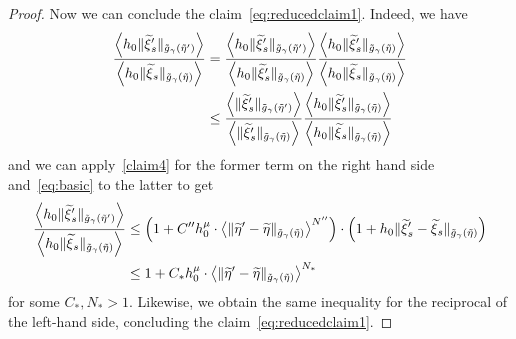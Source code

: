 \documentclass[AHL,Unicode,longabstracts,published]{cedram}
\let\oldtilde\tilde
\renewcommand*{\tilde}[1]{\mathchoice{\widetilde{#1}}{\widetilde{#1}}{\oldtilde{#1}}{\oldtilde{#1}}}
\begin{document}
\begin{proof}
Now we can conclude the claim~\eqref{eq:reducedclaim1}. Indeed, we have
\begin{align*}
\frac{\left\langle h_{0}\|\tilde{\xi}'_{s}\|_{\tilde{g}_{\gamma}\left(\tilde{\eta}'\right)}\right\rangle}{\left\langle h_{0}\|\tilde{\xi}_{s}\|_{\tilde{g}_{\gamma}\left(\tilde{\eta}\right)}\right\rangle} & =\frac{\left\langle h_{0}\|\tilde{\xi}'_{s}\|_{\tilde{g}_{\gamma}\left(\tilde{\eta}'\right)}\right\rangle}{\left\langle h_{0}\|\tilde{\xi}'_{s}\|_{\tilde{g}_{\gamma}\left(\tilde{\eta}\right)}\right\rangle}\frac{\left\langle h_{0}\|\tilde{\xi}'_{s}\|_{\tilde{g}_{\gamma}\left(\tilde{\eta}\right)}\right\rangle}{\left\langle h_{0}\|\tilde{\xi}_{s}\|_{\tilde{g}_{\gamma}\left(\tilde{\eta}\right)}\right\rangle}\\
& \le\frac{\left\langle\|\tilde{\xi}'_{s}\|_{\tilde{g}_{\gamma}\left(\tilde{\eta}'\right)}\right\rangle}{\left\langle\|\tilde{\xi}'_{s}\|_{\tilde{g}_{\gamma}\left(\tilde{\eta}\right)}\right\rangle}\frac{\left\langle h_{0}\|\tilde{\xi}'_{s}\|_{\tilde{g}_{\gamma}\left(\tilde{\eta}\right)}\right\rangle}{\left\langle h_{0}\|\tilde{\xi}_{s}\|_{\tilde{g}_{\gamma}\left(\tilde{\eta}\right)}\right\rangle}
\end{align*}
and we can apply~\eqref{claim4} for the former term on the right hand side and~\eqref{eq:basic} to the latter to get
\begin{align*}
\frac{\left\langle h_{0}\|\tilde{\xi}'_{s}\|_{\tilde{g}_{\gamma}\left(\tilde{\eta}'\right)}\right\rangle}{\left\langle h_{0}\|\tilde{\xi}_{s}\|_{\tilde{g}_{\gamma}\left(\tilde{\eta}\right)}\right\rangle} & \le \left(1+C''h_{0}^{\mu}\cdot\left\langle \|\tilde{\eta}'-\tilde{\eta}\|_{\tilde{g}_{\gamma}\left(\tilde{\eta}\right)}\right\rangle ^{N''}\right)\cdot\left(1+h_{0}\|\tilde{\xi}'_{s}-\tilde{\xi}_{s}\|_{\tilde{g}_{\gamma}\left(\tilde{\eta}\right)}\right)\\
& \le1+C_{*}h_{0}^{\mu}\cdot\left\langle \|\tilde{\eta}'-\tilde{\eta}\|_{\tilde{g}_{\gamma}\left(\tilde{\eta}\right)}\right\rangle ^{N_{*}}
\end{align*}
for some $C_{*},N_{*}>1$. Likewise, we obtain the same inequality for the reciprocal of the left-hand side, concluding the claim~\eqref{eq:reducedclaim1}.


\end{proof}
\end{document}
